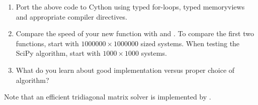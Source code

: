 \begin{problem}
\leavevmode
\begin{enumerate}
\item Port the above code to Cython using typed for-loops, typed memoryviews and appropriate compiler directives.
\item Compare the speed of your new function with  and .
To compare the first two functions, start with $1000000 \times 1000000$ sized systems.
When testing the SciPy algorithm, start with $1000 \times 1000$ systems.
\item What do you learn about good implementation versus proper choice of algorithm?
\end{enumerate}
Note that an efficient tridiagonal matrix solver is implemented by .
\end{problem}


